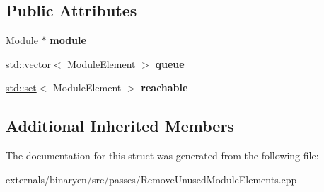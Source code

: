 \subsection*{Public Attributes}
\begin{DoxyCompactItemize}
\item 
\mbox{\label{structwasm_1_1_reachability_analyzer_a50aee3608aa6098fe0b882d512594c2c}} 
\mbox{\hyperlink{classwasm_1_1_module}{Module}} $\ast$ {\bfseries module}
\item 
\mbox{\label{structwasm_1_1_reachability_analyzer_a5505e896208f3ebce76331d4da37cb07}} 
\mbox{\hyperlink{classstd_1_1vector}{std\+::vector}}$<$ Module\+Element $>$ {\bfseries queue}
\item 
\mbox{\label{structwasm_1_1_reachability_analyzer_a90499c4093cb951226f998689e5c322f}} 
\mbox{\hyperlink{classstd_1_1set}{std\+::set}}$<$ Module\+Element $>$ {\bfseries reachable}
\end{DoxyCompactItemize}
\subsection*{Additional Inherited Members}


The documentation for this struct was generated from the following file\+:\begin{DoxyCompactItemize}
\item 
externals/binaryen/src/passes/Remove\+Unused\+Module\+Elements.\+cpp\end{DoxyCompactItemize}
